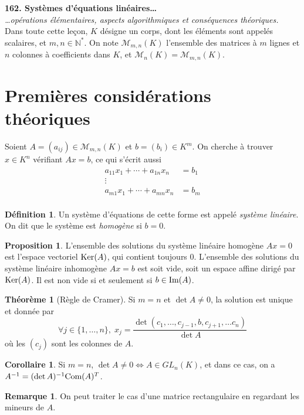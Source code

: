 \documentclass[11pt,a4paper,twocolumn]{article}
\author{\textsc{Nguyễn} Lê Thành Dũng}
\theoremstyle{definition}
\newtheorem{definition}[equation]{Définition}
\newtheorem{proposition}[equation]{Proposition}
\newtheorem{theorem}[equation]{Théorème}
\newtheorem{remark}[equation]{Remarque}
\newtheorem{corollary}[equation]{Corollaire}
\newcounter{n}
\newcommand\lesson[1]{{\noindent \LARGE \bfseries #1}\\[1pt]}
\def\N{\mathbb{N}}
\def\M{\mathcal{M}}
\begin{document}
\lesson{162. Systèmes d'équations linéaires…}
\textit{…opérations élémentaires, aspects algorithmiques et conséquences théoriques.}\\

Dans toute cette leçon, $K$ désigne un corps, dont les éléments sont appelés
scalaires, et $m, n \in \N^*$. On note $\M_{m,n}(K)$ l'ensemble des matrices à
$m$ lignes et $n$ colonnes à coefficients dans $K$, et $\M_n(K) = \M_{m,n}(K)$.

\section{Premières considérations théoriques}

Soient $A = (a_{ij}) \in \M_{m,n}(K)$ et $b = (b_i) \in K^m$. On cherche à
trouver $x \in K^n$ vérifiant $Ax = b$, ce qui s'écrit aussi
\begin{align*} 
  a_{11} x_1 + \cdots + a_{1n} x_n &= b_1 \\
  \vdots \qquad & \\
  a_{m1} x_1 + \cdots + a_{mn} x_n &= b_m \\
\end{align*}
\begin{definition}
  Un système d'équations de cette forme est appelé \emph{système linéaire}. On
  dit que le système est \emph{homogène} si $b = 0$.
\end{definition}

\begin{proposition}
  L'ensemble des solutions du système linéaire homogène $Ax = 0$ est l'espace
  vectoriel $\textnormal{Ker}(A)$, qui contient toujours $0$. L'ensemble des
  solutions du système linéaire inhomogène $Ax = b$ est soit vide, soit un
  espace affine dirigé par $\textnormal{Ker}(A)$. Il est non vide si et
  seulement si $b \in \textnormal{Im}(A)$.
\end{proposition}

\begin{theorem}[Règle de Cramer]
  Si $m = n$ et $\det A \neq 0$, la solution est unique et donnée par
  \[ \forall j \in \{1, \ldots, n\},\;
    x_j = \frac{\det (c_1, \ldots, c_{j-1}, b, c_{j+1}, \ldots c_n)}{\det A} \]
  où les $(c_j)$ sont les colonnes de $A$.
\end{theorem}
\begin{corollary}
  Si $m = n$,
  $\det A \neq 0 \Leftrightarrow A \in GL_n(K)$, et dans ce cas, on a
  $A^{-1} = (\det A)^{-1}\textnormal{Com}(A)^T$.
\end{corollary}
\begin{remark}
  On peut traiter le cas d'une matrice rectangulaire en regardant les mineurs de $A$.
\end{remark}
\end{document}
